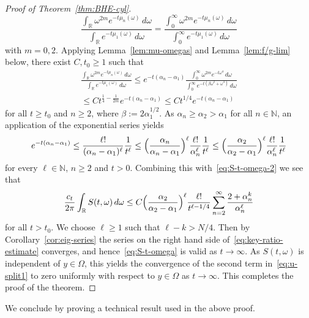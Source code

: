 \documentclass[a4paper, reqno]{amsart}
\numberwithin{equation}{section}
\theoremstyle{plain}
\theoremstyle{definition}
\theoremstyle{remark}
\newcommand{\NN}{\mathbb{N}}
\newcommand{\RR}{\mathbb{R}}
\begin{document}
\begin{proof}[Proof of Theorem~\ref{thm:BHE-cyl}]
\begin{equation*}
    \frac{ \int_\RR \omega^{2m} e^{-t \mu_n(\omega) } \,d\omega}{\int_\RR e^{-t\mu_1(\omega)} \,d\omega }
    = \frac{ \int_0^\infty \omega^{2m}e^{-t \mu_n(\omega) } \,d\omega}{\int_0^\infty e^{-t\mu_1(\omega)} \,d\omega }
  \end{equation*}
  with $m=0,2$. Applying Lemma~\ref{lem:mu-omegas} and Lemma~\ref{lem:f/g-lim} below, there exist $C,t_0\geq 1$ such that
  \begin{multline}
    \label{eq:key-ratio}
    \frac{ \int_\RR \omega^{2m} e^{-t \mu_n(\omega) } \,d\omega}{\int_\RR e^{-t\mu_1(\omega)} \,d\omega }
    \leq e^{-t(\alpha_n-\alpha_1)}\frac{ \int_0^\infty \omega^{2m} e^{-t\omega^4 }\,d\omega}{\int_0^\infty e^{-t(\beta\omega^2+\omega^4)}\,d\omega }\\
    \leq Ct^{\frac{1}{4}-\frac{1}{2m}}e^{-t(\alpha_n-\alpha_1)}
    \leq Ct^{1/4}e^{-t(\alpha_n-\alpha_1)}
  \end{multline}
  for all $t\geq t_0$ and $n\geq 2$, where $\beta:=2\alpha_1^{1/2}$. As $\alpha_n\geq\alpha_2>\alpha_1$ for all $n\in\NN$, an application of the exponential series yields
  \begin{equation*}
    e^{-t(\alpha_n-\alpha_1)}
    \leq\frac{\ell!}{(\alpha_n-\alpha_1)^\ell}\frac{1}{t^\ell}
    \leq\Bigl(\frac{\alpha_n}{\alpha_n-\alpha_1}\Bigr)^{\ell}\frac{\ell!}{\alpha_n^\ell}\frac{1}{t^\ell}
    \leq\Bigl(\frac{\alpha_2}{\alpha_2-\alpha_1}\Bigr)^{\ell}\frac{\ell!}{\alpha_n^\ell}\frac{1}{t^\ell}
  \end{equation*}
  for every $\ell\in\NN$, $n \ge 2$ and $t > 0$. Combining this with~\eqref{eq:S-t-omega-2} we see that
  \begin{equation}
    \label{eq:key-ratio-estimate}
    \frac{c_t}{2\pi} \int_\RR S(t, \omega) \,d\omega
    \leq C\Bigl(\frac{\alpha_2}{\alpha_2-\alpha_1}\Bigr)^{\ell}\frac{\ell!}{t^{\ell-1/4}}\sum_{n=2}^\infty \frac{2+\alpha_n^k}{\alpha_n^\ell}
  \end{equation}
  for all $t>t_0$. We choose $\ell\geq 1$ such that $\ell-k>N/4$. Then by Corollary~\ref{cor:eig-series} the series on the right hand side of~\eqref{eq:key-ratio-estimate} converges, and hence~\eqref{eq:S-t-omega} is valid as $t\to\infty$. As $S(t,\omega)$ is independent of $y\in\Omega$, this yields the convergence of the second term in~\eqref{eq:u-split1} to zero uniformly with respect to $y\in\Omega$ as $t\to\infty$. This completes the proof of the theorem.
\end{proof}
We conclude by proving a technical result used in the above proof.
\end{document}
